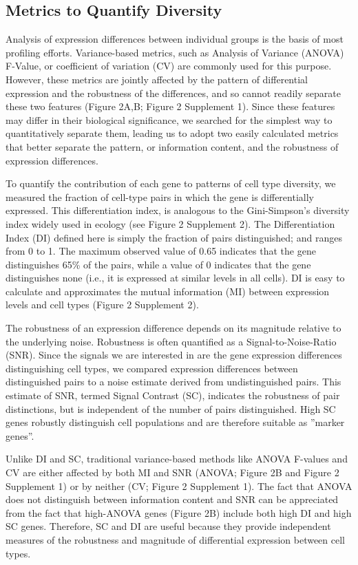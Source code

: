 \subsection{Metrics to Quantify Diversity}
Analysis of expression differences between individual groups is the basis of most profiling efforts. Variance-based metrics, such as Analysis of Variance (ANOVA) F-Value, or coefficient of variation (CV) are commonly used for this purpose. However, these metrics are jointly affected by the pattern of differential expression and the robustness of the differences, and so cannot readily separate these two features (Figure 2A,B; Figure 2 Supplement 1). Since these features may differ in their biological significance, we searched for the simplest way to quantitatively separate them, leading us to adopt two easily calculated metrics that better separate the pattern, or information content, and the robustness of expression differences.

To quantify the contribution of each gene to patterns of cell type diversity, we measured the fraction of cell-type pairs in which the gene is differentially expressed. This differentiation index, is analogous to the Gini-Simpson's diversity index \cite{Simpson_1949} widely used in ecology (see Figure 2 Supplement 2). The Differentiation Index (DI) defined here is simply the fraction of pairs distinguished; and ranges from 0 to 1. The maximum observed value of 0.65 indicates that the gene distinguishes 65\% of the pairs, while a value of 0 indicates that the gene distinguishes none (i.e., it is expressed at similar levels in all cells). DI is easy to calculate and approximates the mutual information (MI) between expression levels and cell types (Figure 2 Supplement 2). 

The robustness of an expression difference depends on its magnitude relative to the underlying noise. Robustness is often quantified as a Signal-to-Noise-Ratio (SNR). Since the signals we are interested in are the gene expression differences distinguishing cell types, we compared expression differences between distinguished pairs to a noise estimate derived from undistinguished pairs. This estimate of SNR, termed Signal Contrast (SC), indicates the robustness of pair distinctions, but is independent of the number of pairs distinguished. High SC genes robustly distinguish cell populations and are therefore suitable as ”marker genes”. %

Unlike DI and SC, traditional variance-based methods like ANOVA F-values and CV are either affected by both MI and SNR (ANOVA; Figure 2B and Figure 2 Supplement 1) or by neither (CV; Figure 2 Supplement 1). The fact that ANOVA does not distinguish between information content and SNR can be appreciated from the fact that high-ANOVA genes (Figure 2B) include both high DI and high SC genes. Therefore, SC and DI are useful because they provide independent measures of the robustness and magnitude of differential expression between cell types.

